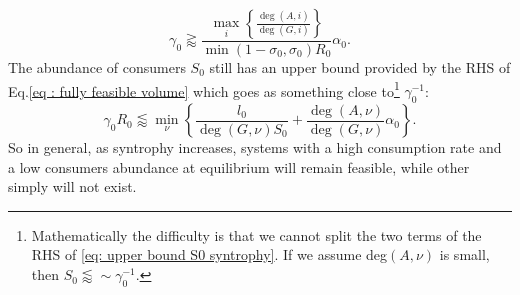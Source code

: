 \documentclass[12pt, titlepage]{report}
\begin{document}
  \begin{equation}
  \gamma_0 \gtrapprox \frac{\max_i\left\{\frac{\deg(A,i)}{\deg(G,i)}\right\}}{\min(1-\sigma_0, \sigma_0) R_0} \alpha_0.
  \end{equation}
  The abundance of consumers $S_0$ still has an upper bound provided by the RHS of Eq.\eqref{eq : fully feasible volume} which goes as something close to\footnote{Mathematically the difficulty is that we cannot split the two terms of the RHS of \eqref{eq: upper bound S0 syntrophy}. If we assume deg$(A,\nu)$ is small, then $S_0 \lessapprox \sim \gamma_0^{-1}$.} $\gamma_0^{-1}$:
  \begin{equation}
 \gamma_0 R_0
  \lessapprox
   \min_\nu \left\{ \frac{l_0}{\deg(G,\nu) S_0} + \frac{\deg(A,\nu)}{\deg(G,\nu)}\alpha_0\right\}.\label{eq: upper bound S0 syntrophy}
  \end{equation}
  So in general, as syntrophy increases, systems with a high consumption rate and a low consumers abundance at equilibrium will remain feasible, while other simply will not exist. %
\end{document}
